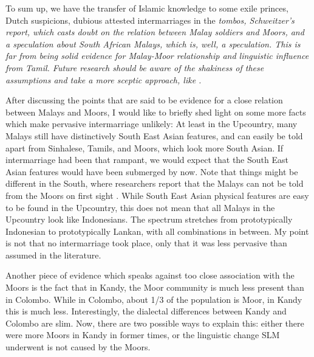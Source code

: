 To sum up, we have  the  transfer of Islamic knowledge to some exile princes, Dutch suspicions,  dubious attested intermarriages in the \em tombos\em, Schweitzer's report, which casts doubt on the relation between Malay soldiers and Moors, and a speculation about South African Malays, which is, well, a speculation. This is far from being solid evidence for Malay-Moor relationship and linguistic influence from Tamil. Future research should be aware of the shakiness of these assumptions and take a more sceptic approach, like \citet{Ansaldo2005ms}.

After discussing the points that are said to be evidence for a close relation between Malays and Moors, I would like to briefly shed light on some more facts which make pervasive intermarriage unlikely: At least in the Upcountry, many Malays still have   distinctively South East Asian features, and can easily be told apart from Sinhalese, Tamils, and Moors, which look more South Asian. If intermarriage had been that rampant, we would expect that the South East Asian features would have been submerged by now. Note that things might be different in the South, where researchers report that the Malays can not be told from the Moors on first sight \citep{abc}. While South East Asian physical features are easy to be found in the Upcountry, this does not mean that all Malays in the Upcountry look like Indonesians. The spectrum stretches from prototypically Indonesian to prototypically Lankan, with all combinations in between. My point is not that no intermarriage took place, only that it was less pervasive than assumed in the literature.

Another piece of evidence which speaks against too close association with the Moors is the fact that in Kandy, the Moor community is much less present than in Colombo. While in Colombo, about 1/3 of the population is Moor, in Kandy this is much less. Interestingly, the dialectal differences between Kandy and Colombo are slim. Now, there are two possible ways to explain this: either there were more Moors in Kandy in former times, or the linguistic change SLM underwent is not caused by the Moors.
 


